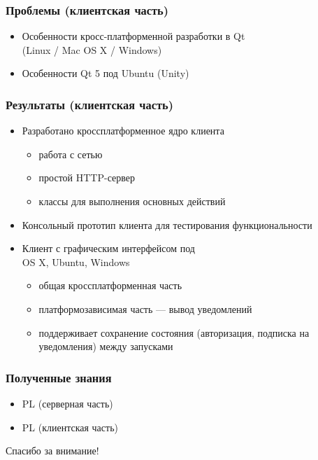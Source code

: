 \documentclass[10pt,pdf,hyperref={unicode}]{beamer}
\begin{document}
    \begin{frame}\frametitle{Проблемы (клиентская часть)}
        \begin{itemize}%
            \item Особенности кросс-платформенной разработки в Qt \\
            (Linux / Mac OS X / Windows)
            \item Особенности Qt 5 под Ubuntu (Unity)
        \end{itemize}
    \end{frame}
    
    \begin{frame}\frametitle{Результаты (клиентская часть)}
        \begin{itemize}%
            \item Разработано кроссплатформенное ядро клиента            	
            \begin{itemize}
                \item работа с сетью
                \item простой HTTP-сервер
                \item классы для выполнения основных действий
            \end{itemize}
            \item Консольный прототип клиента для тестирования функциональности
            \item Клиент с графическим интерфейсом под \\ OS X, Ubuntu, Windows
            \begin{itemize}
                \item общая кроссплатформенная часть
                \item платформозависимая часть --- вывод уведомлений
                \item поддерживает сохранение состояния (авторизация, подписка
                на уведомления) между запусками
            \end{itemize}
        \end{itemize}
    \end{frame}

    \begin{frame}\frametitle{Полученные знания}
        \begin{itemize}%
            \item	PL (серверная часть)
            \item	PL (клиентская часть)
        \end{itemize}
    \end{frame}

    \begin{frame}
        \begin{center}
            Спасибо за внимание!
        \end{center}
    \end{frame}
\end{document}
